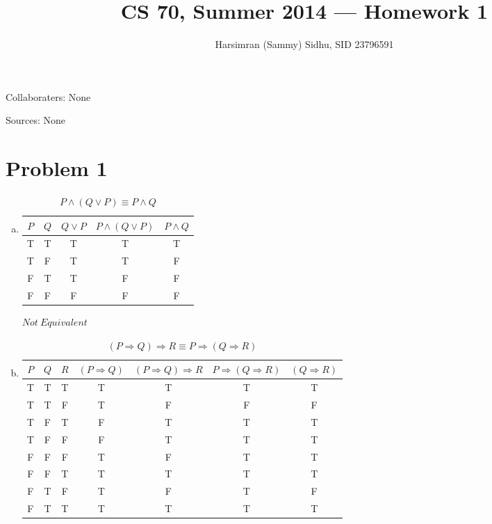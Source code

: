 \documentclass[11pt,letterpaper]{article}
\title{CS 70, Summer 2014 --- Homework 1} %
\author{Harsimran (Sammy) Sidhu, SID 23796591} %
\begin{document}
\maketitle

Collaboraters: None

Sources: None

\section*{Problem 1} %

\begin{enumerate}[(a)]

\item
\begin{table}[h] 
\caption{$P\wedge (Q\vee P) \equiv P \wedge Q$} %
\centering %
\begin{tabular}{c c c c c} %
\hline %
$P$ & $Q$ & $Q\vee{P}$ & $P\wedge{(Q\vee P)}$ & $P\wedge Q$ \\ %
\hline %
T & T & T & T & T \\
T & F & T & T & F \\
F & T & T & F & F \\
F & F & F & F & F \\ %
\hline %
\end{tabular} 
\label{table:1a} %
\end{table}

$Not~Equivalent$


\item 

\begin{table}[h] 
\caption{$(P\Rightarrow Q)\Rightarrow R \equiv P\Rightarrow (Q\Rightarrow R)$} %
\centering %
\begin{tabular}{c c c c c c c} %
\hline %
$P$ & $Q$ & $R$ \vline & $(P\Rightarrow Q)$ \vline & $(P\Rightarrow Q)\Rightarrow R$ \vline & $P\Rightarrow (Q\Rightarrow R)$ \vline & $(Q\Rightarrow R)$ \\ %
\hline %
T & T & T & T & T & T & T\\
T & T & F & T & F & F & F\\
T & F & T & F & T & T & T\\
T & F & F & F & T & T & T\\
F & F & F & T & F & T & T\\
F & F & T & T & T & T & T\\
F & T & F & T & F & T & F\\
F & T & T & T & T & T & T\\
\hline %
\end{tabular} 
\label{table:1a} %
\end{table}


\end{enumerate}
\end{document}
